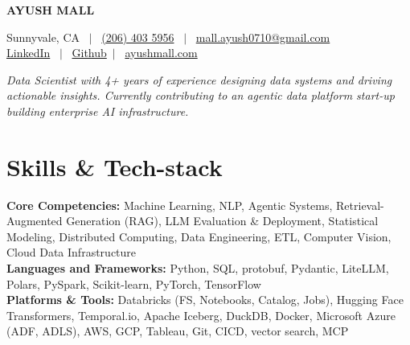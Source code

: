 \documentclass[10pt,a4paper]{article}
\begin{document}

\noindent
\begin{minipage}[c]{0.45\textwidth}
    \vspace{0pt}
    {\LARGE \textbf{AYUSH MALL}}
\end{minipage}%
\begin{minipage}[c]{0.55\textwidth}
    \raggedleft
    Sunnyvale, CA \ $|$ \ \href{tel:12064035956}{(206) 403 5956} \ $|$ \
    \href{mailto:mall.ayush0710@gmail.com?subject=Resume\%20Enquiry}{mall.ayush0710@gmail.com} \\
    \href{https://www.linkedin.com/in/ayush-mall}{LinkedIn} \ $|$ \
    \href{https://github.com/ayushmall0710}{Github}\ $|$ \
    \href{https://ayushmall.com}{ayushmall.com} \\
\end{minipage}

\vspace{0.2em}

\noindent\textit{Data Scientist with 4+ years of experience designing data systems and driving actionable insights. Currently contributing to an agentic data platform start-up building enterprise AI infrastructure.}




\section*{Skills \& Tech-stack}

\textbf{Core Competencies:} Machine Learning, NLP, Agentic Systems, Retrieval-Augmented Generation (RAG), LLM Evaluation \& Deployment, Statistical Modeling, Distributed Computing, Data Engineering, ETL, Computer Vision, Cloud Data Infrastructure \\
\textbf{Languages and Frameworks:} Python, SQL, protobuf, Pydantic, LiteLLM, Polars, PySpark, Scikit-learn, PyTorch, TensorFlow \\
\textbf{Platforms \& Tools:} Databricks (FS, Notebooks, Catalog, Jobs), Hugging Face Transformers, Temporal.io, Apache Iceberg, DuckDB, Docker, Microsoft Azure (ADF, ADLS), AWS, GCP, Tableau, Git, CICD, vector search, MCP
\end{document}

